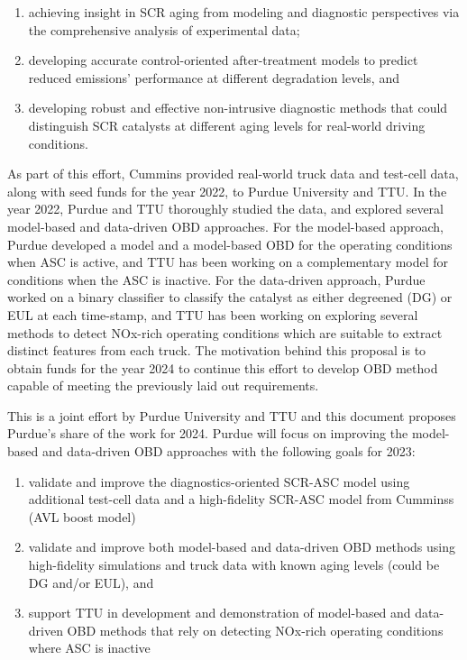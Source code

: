 \documentclass[letterpaper, 11pt]{article}
\begin{document}
\begin{enumerate}
\item achieving insight in SCR aging from modeling and diagnostic perspectives
via the comprehensive analysis of experimental data;
\item developing accurate control-oriented after-treatment models to predict
reduced emissions' performance at different degradation levels, and
\item developing robust and effective non-intrusive diagnostic methods that could distinguish SCR catalysts at different aging levels for real-world driving conditions.
\end{enumerate}

As part of this effort, Cummins provided real-world truck data and test-cell data, along with seed funds for the year 2022, to Purdue University and TTU. In the year 2022, Purdue and TTU thoroughly studied the data, and explored several model-based and data-driven OBD approaches. For the model-based approach, Purdue developed a model and a model-based OBD for the operating conditions when ASC is active, and TTU has been working on a complementary model for conditions when the ASC is inactive. For the data-driven approach, Purdue worked on a binary classifier to classify the catalyst as either degreened (DG) or EUL at each time-stamp, and TTU has been working on exploring several methods to detect NOx-rich operating conditions which are suitable to extract distinct features from each truck. The motivation behind this proposal is to obtain funds for the year 2024 to continue this effort to develop OBD method capable of meeting the previously laid out requirements.

This is a joint effort by Purdue University and TTU and this document proposes
Purdue's share of the work for 2024. Purdue will focus on improving the
model-based and data-driven OBD approaches with the following goals for 2023:
\begin{enumerate}
\item validate and improve the diagnostics-oriented SCR-ASC model using
additional test-cell data and a high-fidelity SCR-ASC model from Cumminss (AVL
boost model)
\item validate and improve both model-based and data-driven OBD methods using
high-fidelity simulations and truck data with known aging levels (could be DG
and/or EUL), and
\item  support TTU in development and demonstration of model-based and data-driven OBD methods that rely on detecting NOx-rich operating conditions where ASC is inactive
\end{enumerate}
\end{document}
